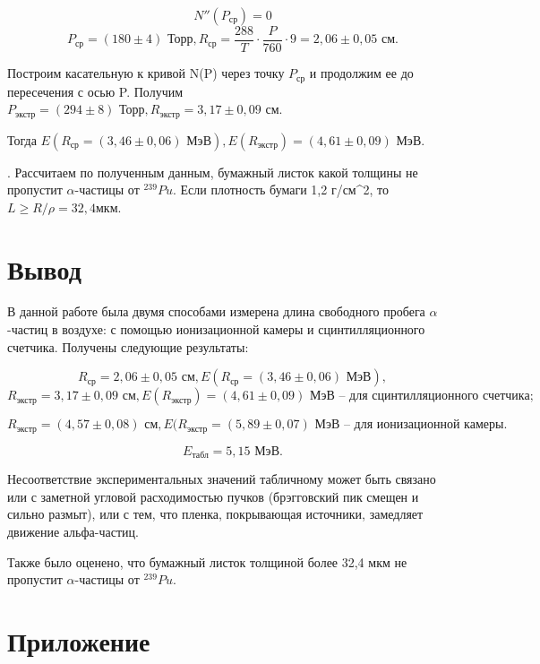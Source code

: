 \documentclass[a4paper,12pt]{article} %
\begin{document}
\medskip 

$$N''(P_{\text{ср}}) = 0$$
$$P_{\text{ср}} = (180 \pm 4) \text{ Торр}, R_{\text{ср}} = \frac{288}{T} \cdot \frac{P}{760} \cdot 9 = 2,06 \pm 0,05 \text{ см}.$$

\noindent Построим касательную к кривой N(P) через точку $P_{\text{ср}}$ и продолжим ее до пересечения с осью P. Получим $P_{\text{экстр}} = (294 \pm 8) \text{ Торр}, R_{\text{экстр}} = 3,17 \pm 0,09 \text{ см}.$ 

\medskip

\noindent Тогда $E(R_{\text{ср}} = (3,46 \pm 0,06) \text{ МэВ}), E(R_{\text{экстр}}) = (4,61 \pm 0,09) \text{ МэВ}$.

\medskip

. Рассчитаем по полученным данным, бумажный листок какой толщины не пропустит $\alpha$-частицы от $^{239} Pu$. Если плотность бумаги 1,2 г/см^2, то $L \ge R/\rho = 32,4 мкм.$

\section{Вывод}

\noindent В данной работе была двумя способами измерена длина свободного пробега $\alpha$-частиц в воздухе: с помощью ионизационной камеры и сцинтилляционного счетчика. Получены следующие результаты:

$$R_{\text{ср}} = 2,06 \pm 0,05 \text{ см}, E(R_{\text{ср}} = (3,46 \pm 0,06) \text{ МэВ}),$$
$$R_{\text{экстр}} = 3,17 \pm 0,09 \text{ см}, E(R_{\text{экстр}}) = (4,61 \pm 0,09) \text{ МэВ}  \text{ -- для сцинтилляционного счетчика};$$

$$R_{\text{экстр}} =(4,57 \pm 0,08) \text{ см}, E(R_{\text{экстр}} = (5,89 \pm 0,07) \text{ МэВ}  \text { -- для ионизационной камеры}.$$

$$E_{\text{табл}} = 5,15 \text{ МэВ}.$$

\medskip

\noindent Несоответствие экспериментальных значений табличному может быть связано или с заметной угловой расходимостью пучков (брэгговский пик смещен и сильно размыт), или с тем, что пленка, покрывающая источники, замедляет движение альфа-частиц.

\medskip
 
\noindent Также было оценено, что бумажный листок толщиной более 32,4 мкм не пропустит $\alpha$-частицы от $^{239} Pu$.

\newpage

\section{Приложение}
\end{document}
